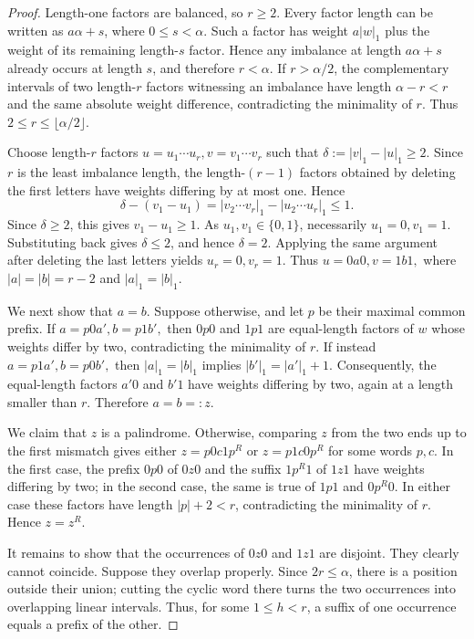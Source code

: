 \documentclass[11pt]{article}
\theoremstyle{definition}
\begin{document}
\begin{proof}
Length-one factors are balanced, so $r\ge2$. Every factor length can
be written as $a\alpha+s$, where $0\le s<\alpha$. Such a factor has
weight $a|w|_1$ plus the weight of its remaining length-$s$ factor.
Hence any imbalance at length $a\alpha+s$ already occurs at length
$s$, and therefore $r<\alpha$. If $r>\alpha/2$, the complementary
intervals of two length-$r$ factors witnessing an imbalance have
length $\alpha-r<r$ and the same absolute weight difference,
contradicting the minimality of $r$. Thus
$
2\le r\le\lfloor\alpha/2\rfloor.
$

Choose length-$r$ factors
$
u=u_1\cdots u_r,$$v=v_1\cdots v_r
$
such that
$
\delta:=|v|_1-|u|_1\ge2.
$
Since $r$ is the least imbalance length, the length-$(r-1)$ factors
obtained by deleting the first letters have weights differing by at
most one. Hence
\[
\delta-(v_1-u_1)
=
|v_2\cdots v_r|_1-|u_2\cdots u_r|_1
\le1.
\]
Since $\delta\ge2$, this gives $v_1-u_1\ge1$. As
$u_1,v_1\in\{0,1\}$, necessarily
$
u_1=0,v_1=1.
$
Substituting back gives $\delta\le2$, and hence $\delta=2$.
Applying the same argument after deleting the last letters yields
$
u_r=0,v_r=1.
$
Thus
$
u=0a0, v=1b1,
$
where $|a|=|b|=r-2$ and $|a|_1=|b|_1$.

We next show that $a=b$. Suppose otherwise, and let $p$ be their
maximal common prefix. If
$
a=p0a', b=p1b',
$
then $0p0$ and $1p1$ are equal-length factors of $w$ whose weights
differ by two, contradicting the minimality of $r$. If instead
$
a=p1a', b=p0b',
$
then $|a|_1=|b|_1$ implies
$
|b'|_1=|a'|_1+1.
$
Consequently, the equal-length factors $a'0$ and $b'1$ have weights
differing by two, again at a length smaller than $r$. Therefore
$a=b=:z$.

We claim that $z$ is a palindrome. Otherwise, comparing $z$ from
the two ends up to the first mismatch gives either
$
z=p0c1p^R
$ or $
z=p1c0p^R
$
for some words $p,c$. In the first case, the prefix $0p0$ of $0z0$
and the suffix $1p^R1$ of $1z1$ have weights differing by two; in
the second case, the same is true of $1p1$ and $0p^R0$. In either
case these factors have length $|p|+2<r$, contradicting the
minimality of $r$. Hence $z=z^R$.

It remains to show that the occurrences of $0z0$ and $1z1$ are
disjoint. They clearly cannot coincide. Suppose they overlap
properly. Since $2r\le\alpha$, there is a position outside their
union; cutting the cyclic word there turns the two occurrences into
overlapping linear intervals. Thus, for some $1\le h<r$, a suffix
of one occurrence equals a prefix of the other.


\end{proof}
\end{document}
